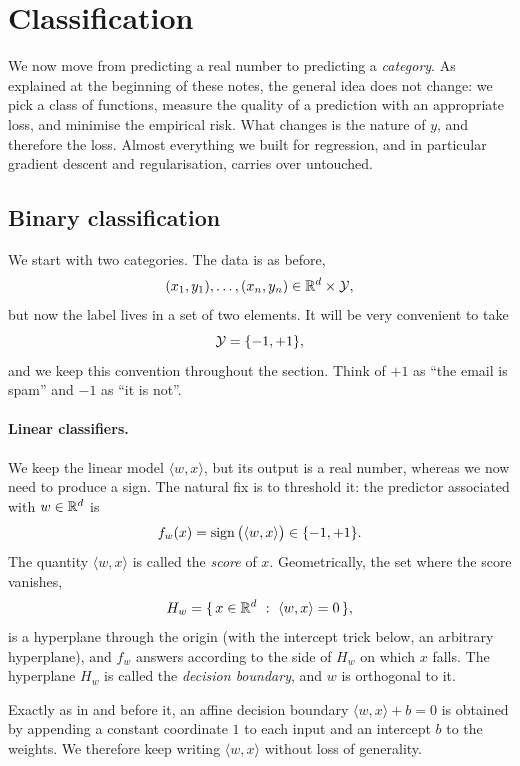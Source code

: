 \section{Classification}
\label{sec:classification}

We now move from predicting a real number to predicting a \emph{category}. As
explained at the beginning of these notes, the general idea does not change: we
pick a class of functions, measure the quality of a prediction with an appropriate
loss, and minimise the empirical risk. What changes is the nature of $y$, and
therefore the loss. Almost everything we built for regression, and in particular
gradient descent and regularisation, carries over untouched.

\subsection{Binary classification}
\label{subsec:binary}

We start with two categories. The data is as before,
\[
(x_1, y_1), \dots, (x_n, y_n) \in \mathbb{R}^d \times \mathcal{Y} ,
\]
but now the label lives in a set of two elements. It will be very convenient to take
\[
\mathcal{Y} = \{-1, +1\} ,
\]
and we keep this convention throughout the section. Think of $+1$ as ``the email is
spam'' and $-1$ as ``it is not''.

\paragraph{Linear classifiers.}
We keep the linear model $\langle w, x \rangle$, but its output is a real number,
whereas we now need to produce a sign. The natural fix is to threshold it: the
predictor associated with $w \in \mathbb{R}^d$ is
\[
f_w(x) = \mathop{ \rm sign} \big( \langle w, x \rangle \big) \in \{-1, +1\} .
\]
The quantity $\langle w, x \rangle$ is called the \emph{score} of $x$. Geometrically,
the set where the score vanishes,
\[
H_w = \{\, x \in \mathbb{R}^d \ : \ \langle w, x \rangle = 0 \,\} ,
\]
is a hyperplane through the origin (with the intercept trick below, an arbitrary
hyperplane), and $f_w$ answers according to the side of $H_w$ on which $x$ falls. The
hyperplane $H_w$ is called the \emph{decision boundary}, and $w$ is orthogonal to it.

\begin{remark}
Exactly as in  and before it, an affine decision boundary
$\langle w, x \rangle + b = 0$ is obtained by appending a constant coordinate $1$ to
each input and an intercept $b$ to the weights. We therefore keep writing $\langle w,
x\rangle$ without loss of generality.
\end{remark}

